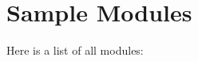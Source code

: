 \section{Sample Modules}
Here is a list of all modules:\begin{CompactList}
\item {}
\end{CompactList}
